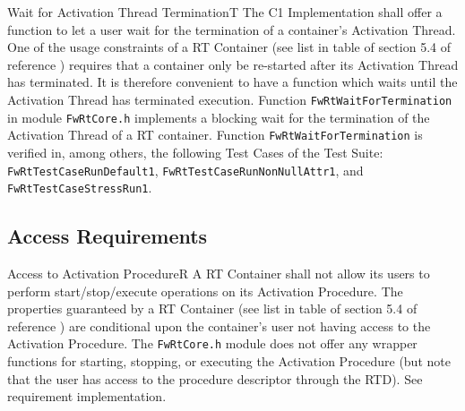 \documentclass[a4paper,10pt]{article}
\newenvironment{fw_req}[6]
{\addtocounter{subsubsection}{1}
	\hspace{0.2cm}\textbf{FW-\arabic{section}.\arabic{subsection}.\arabic{subsubsection}/#2
	\hspace{0.8cm} #1}
	\vspace{-10pt}
\begin{longtable}{p{2.7cm}P{8.5cm}}
\hline
\textsc{Requirement} & #3 \\
\textsc{Justification} & #4 \\
\textsc{Implementation} & #5  \\ 
\textsc{Verification} & #6  \\
\hline
}
{\end{longtable}}
\begin{document}
\begin{fw_req}{Wait for Activation Thread Termination}{T}
{The C1 Implementation shall offer a function to let a user wait for the termination of a container's Activation Thread.}
{One of the usage constraints of a RT Container (see list in table of section 5.4 of reference \cite{ref:fwprofile}) requires that a container only be re-started after its Activation Thread has terminated. It is therefore convenient to have a function which waits until the Activation Thread has terminated execution. }
{Function \texttt{FwRtWaitForTermination} in module \texttt{FwRtCore.h} implements a blocking wait for the termination of the Activation Thread of a RT container.} 
{Function \texttt{FwRtWaitForTermination} is verified in, among others, the following Test Cases of the Test Suite: \texttt{FwRtTestCaseRunDefault1}, \texttt{FwRtTestCaseRunNonNullAttr1}, and \texttt{FwRtTestCaseStressRun1}.}
\end{fw_req}

\subsection{Access Requirements}\label{req:access}

\begin{fw_req}{Access to Activation Procedure}{R}
{A RT Container shall not allow its users to perform start/stop/execute operations on its Activation Procedure.}
{The properties guaranteed by a RT Container (see list in table of section 5.4 of reference \cite{ref:fwprofile}) are conditional upon the container's user not having access to the Activation Procedure. }
{The \texttt{FwRtCore.h} module does not offer any wrapper functions for starting, stopping, or executing the Activation Procedure (but note that the user has access to the procedure descriptor through the RTD).} 
{See requirement implementation.}
\end{fw_req}
\end{document}
